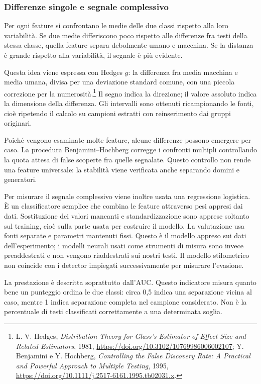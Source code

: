 \documentclass[11pt,a4paper]{article}
\begin{document}
\subsubsection{Differenze singole e segnale complessivo}\label{differenze-singole-e-segnale-complessivo}

Per ogni feature si confrontano le medie delle due classi rispetto alla loro variabilità. Se due medie differiscono poco rispetto alle differenze fra testi della stessa classe, quella feature separa debolmente umano e macchina. Se la distanza è grande rispetto alla variabilità, il segnale è più evidente.

Questa idea viene espressa con Hedges \(g\): la differenza fra media macchina e media umana, divisa per una deviazione standard comune, con una piccola correzione per la numerosità.\footnote{L. V. Hedges, \emph{Distribution Theory for Glass's Estimator of Effect Size and Related Estimators}, 1981, \url{https://doi.org/10.3102/10769986006002107}; Y. Benjamini e Y. Hochberg, \emph{Controlling the False Discovery Rate: A Practical and Powerful Approach to Multiple Testing}, 1995, \url{https://doi.org/10.1111/j.2517-6161.1995.tb02031.x}.} Il segno indica la direzione; il valore assoluto indica la dimensione della differenza. Gli intervalli sono ottenuti ricampionando le fonti, cioè ripetendo il calcolo su campioni estratti con reinserimento dai gruppi originari.

Poiché vengono esaminate molte feature, alcune differenze possono emergere per caso. La procedura Benjamini--Hochberg corregge i confronti multipli controllando la quota attesa di false scoperte fra quelle segnalate. Questo controllo non rende una feature universale: la stabilità viene verificata anche separando domini e generatori.

Per misurare il segnale complessivo viene inoltre usata una regressione logistica. È un classificatore semplice che combina le feature attraverso pesi appresi dai dati. Sostituzione dei valori mancanti e standardizzazione sono apprese soltanto sul training, cioè sulla parte usata per costruire il modello. La valutazione usa fonti separate e parametri mantenuti fissi. Questo è il modello appreso sui dati dell'esperimento; i modelli neurali usati come strumenti di misura sono invece preaddestrati e non vengono riaddestrati sui nostri testi. Il modello stilometrico non coincide con i detector impiegati successivamente per misurare l'evasione.

La prestazione è descritta soprattutto dall'AUC. Questo indicatore misura quanto bene un punteggio ordina le due classi: circa 0,5 indica una separazione vicina al caso, mentre 1 indica separazione completa nel campione considerato. Non è la percentuale di testi classificati correttamente a una determinata soglia.
\end{document}
